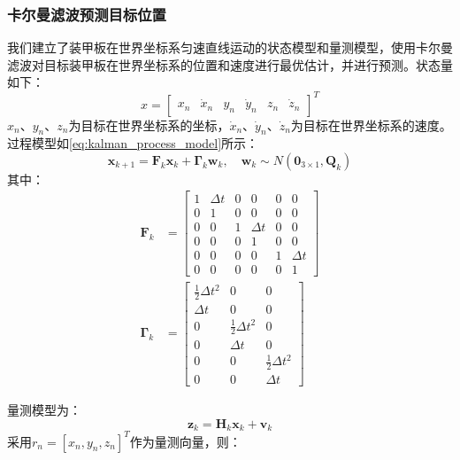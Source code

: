 \subsubsection{卡尔曼滤波预测目标位置}
我们建立了装甲板在世界坐标系匀速直线运动的状态模型和量测模型，使用卡尔曼滤波对目标装甲板在世界坐标系的位置和速度进行最优估计，并进行预测。状态量如下：
\begin{equation}
x={
\left[ \begin{array}{cccccc}
x_n & \dot x_n & y_n & \dot y_n & z_n & \dot z_n
\end{array} 
\right ]}^T
\end{equation}
$x_n$、$y_n$、$z_n$为目标在世界坐标系的坐标，$\dot x_n$、$\dot y_n$、$\dot z_n$为目标在世界坐标系的速度。
过程模型如\eqref{eq:kalman_process_model}所示：
\begin{equation}
\boldsymbol{x}_{k+1}=\boldsymbol{F}_{k} \boldsymbol{x}_{k}+\boldsymbol{\Gamma}_{k} \boldsymbol{w}_{k}, \quad \boldsymbol{w}_{k} \sim N\left(\mathbf{0}_{3 \times 1}, \boldsymbol{Q}_{k}\right)
\label{eq:kalman_process_model}
\end{equation}
其中：
\begin{equation}
\begin{aligned}
\boldsymbol{F}_{k} &=\left[\begin{array}{cccccc}
1 & \Delta t & 0 & 0 & 0 & 0 \\
0 & 1 & 0 & 0 & 0 & 0 \\
0 & 0 & 1 & \Delta t & 0 & 0 \\
0 & 0 & 0 & 1 & 0 & 0 \\
0 & 0 & 0 & 0 & 1 & \Delta t \\
0 & 0 & 0 & 0 & 0 & 1
\end{array}\right] \\
\boldsymbol{\Gamma}_{k} &=\left[\begin{array}{cccc}
\frac{1}{2}\Delta t ^{2} & 0 & 0 \\
\Delta t & 0 & 0 \\
0 & \frac{1}{2} \Delta t ^{2} & 0 \\
0 & \Delta t \ & 0  \\
0 & 0 & \frac{1}{2} \Delta t ^{2} \\
0 & 0 & \Delta t \
\end{array}\right]
\end{aligned}
\end{equation}

量测模型为：
\begin{equation}
\boldsymbol{z}_{k}=\boldsymbol{H}_{k} \boldsymbol{x}_{k}+\boldsymbol{v}_{k}
\end{equation}
采用${r}_{n}=\left[x_{n}, y_{n}, z_{n}\right]^{T}$作为量测向量，则：

